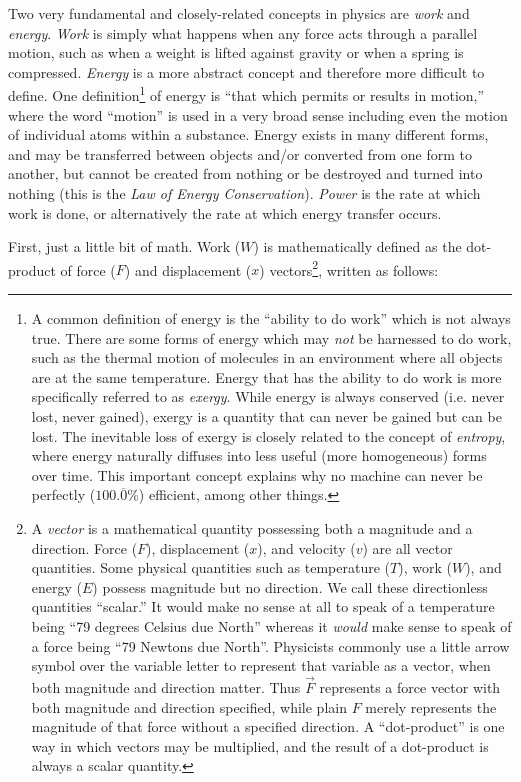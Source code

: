 Two very fundamental and closely-related concepts in physics are \textit{work} and \textit{energy}.  \textit{Work} is simply what happens when any force acts through a parallel motion, such as when a weight is lifted against gravity or when a spring is compressed.  \textit{Energy} is a more abstract concept and therefore more difficult to define.  One definition\footnote{A common definition of energy is the ``ability to do work'' which is not always true.  There are some forms of energy which may \textit{not} be harnessed to do work, such as the thermal motion of molecules in an environment where all objects are at the same temperature.  Energy that has the ability to do work is more specifically referred to as \textit{exergy}.  While energy is always conserved (i.e. never lost, never gained), exergy is a quantity that can never be gained but can be lost.  The inevitable loss of exergy is closely related to the concept of \textit{entropy}, where energy naturally diffuses into less useful (more homogeneous) forms over time.  This important concept explains why no machine can never be perfectly ($100.\overline{0}$\%) efficient, among other things.} of energy is ``that which permits or results in motion,'' where the word ``motion'' is used in a very broad sense including even the motion of individual atoms within a substance.  Energy exists in many different forms, and may be transferred between objects and/or converted from one form to another, but cannot be created from nothing or be destroyed and turned into nothing (this is the \textit{Law of Energy Conservation}).  \textit{Power} is the rate at which work is done, or alternatively the rate at which energy transfer occurs.            

First, just a little bit of math.  Work ($W$) is mathematically defined as the dot-product of force ($F$) and displacement ($x$) vectors\footnote{A \textit{vector} is a mathematical quantity possessing both a magnitude and a direction.  Force ($F$), displacement ($x$), and velocity ($v$) are all vector quantities.  Some physical quantities such as temperature ($T$), work ($W$), and energy ($E$) possess magnitude but no direction.  We call these directionless quantities ``scalar.''  It would make no sense at all to speak of a temperature being ``79 degrees Celsius due North'' whereas it \textit{would} make sense to speak of a force being ``79 Newtons due North''.  Physicists commonly use a little arrow symbol over the variable letter to represent that variable as a vector, when both magnitude and direction matter.  Thus $\vec{F}$ represents a force vector with both magnitude and direction specified, while plain $F$ merely represents the magnitude of that force without a specified direction.  A ``dot-product'' is one way in which vectors may be multiplied, and the result of a dot-product is always a scalar quantity.}, written as follows:

